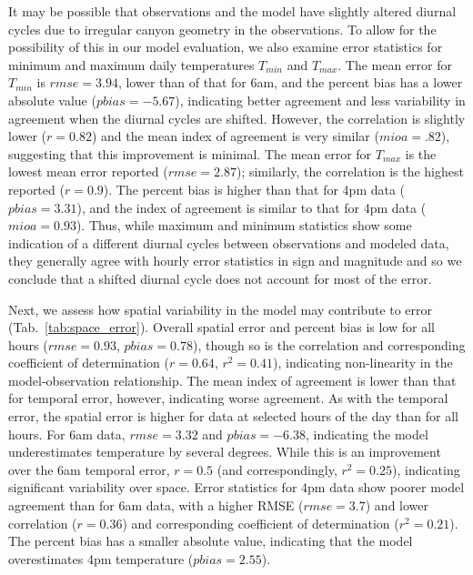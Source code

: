 It may be possible that observations and the model have slightly altered diurnal cycles due to irregular canyon geometry in the observations. To allow for the possibility of this in our model evaluation, we also examine error statistics for minimum and maximum daily temperatures $T_{min}$ and $T_{max}$. The mean error for $T_{min}$ is $rmse=3.94$, lower than of that for 6am, and the percent bias has a lower absolute value ($pbias=-5.67$), indicating better agreement and less variability in agreement when the diurnal cycles are shifted. However, the correlation is slightly lower ($r=0.82$) and the mean index of agreement is very similar ($mioa=.82$), suggesting that this improvement is minimal. The mean error for $T_{max}$ is the lowest mean error reported ($rmse=2.87$); similarly, the correlation is the highest reported ($r=0.9$). The percent bias is higher than that for 4pm data ($pbias=3.31$), and the index of agreement is similar to that for 4pm data ($mioa=0.93$).
Thus, while maximum and minimum statistics show some indication of a different diurnal cycles between observations and modeled data, they generally agree with hourly error statistics in sign and magnitude and so we conclude that a shifted diurnal cycle does not account for most of the error.

Next, we 
assess how spatial variability in the model may contribute to error (Tab.~\ref{tab:space_error}). Overall spatial error and percent bias is low for all hours ($rmse=0.93$, $pbias=0.78$), though so is the correlation and corresponding coefficient of determination ($r=0.64$, $r^2=0.41$), indicating non-linearity in the model-observation relationship. 
The mean index of agreement is lower than that for temporal error, however, indicating worse agreement. 
As with the temporal error, the spatial error is higher for data at selected hours of the day than for all hours. For 6am data, $rmse=3.32$ and $pbias=-6.38$, indicating the model underestimates temperature by several degrees. While this is an improvement over the 6am temporal error, $r=0.5$ (and correspondingly, $r^2 = 0.25$), indicating significant variability over space. Error statistics for 4pm data show poorer model agreement than for 6am data, with a higher RMSE ($rmse = 3.7$) and lower correlation ($r=0.36$) and corresponding coefficient of determination ($r^2 = 0.21$). The percent bias has a smaller absolute value, indicating that the model overestimates 4pm temperature ($pbias=2.55$). 

